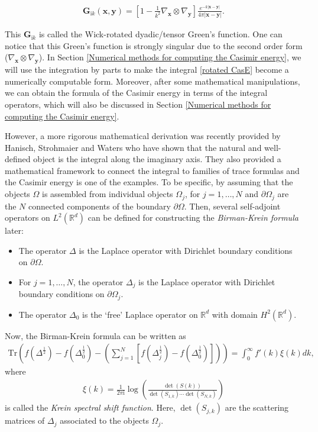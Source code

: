 \begin{align*}
    \boldsymbol{G}_{\mathrm{i}k}(\boldsymbol{x}, \boldsymbol{y}) = \left[1 - \frac{1}{k^{2}}\nabla_{\boldsymbol{x}}\otimes\nabla_{\boldsymbol{y}}\right]\frac{e^{-k|\boldsymbol{x} - \boldsymbol{y}|}}{4\pi|\boldsymbol{x} - \boldsymbol{y}|}.
\end{align*}

This $ \boldsymbol{G}_{\mathrm{i}k}$ is called the Wick-rotated dyadic/tensor Green's function. One can notice that this Green's function is strongly singular 
due to the second order form ($\nabla_{\boldsymbol{x}}\otimes\nabla_{\boldsymbol{y}}$). In Section \ref{Numerical methods for computing the Casimir energy}, we 
will use the integration by parts to make the integral \eqref{rotated CasE} become a numerically computable form. Moreover, after some mathematical manipulations, 
we can obtain the formula of the Casimir energy in terms of the integral operators, which will also be discussed in Section \ref{Numerical methods for computing the Casimir energy}.


However, a more rigorous mathematical 
derivation was recently provided by Hanisch, Strohmaier and Waters \cite{hanisch2020relative} who have shown that the natural and well-defined object is the 
integral along the imaginary axis. They also provided a mathematical framework to connect the integral to families of trace formulas and the Casimir 
energy is one of the examples. To be specific, by assuming that the objects $\Omega$ is assembled from individual objects $\Omega_{j}$, for $j = 1, \dots, N$ and 
$\partial\Omega_{j}$ are the $N$ connected components of the boundary $\partial\Omega$. Then, several self-adjoint operators on $L^{2}(\mathbb{R}^{d})$
can be defined for constructing the \emph{Birman-Krein formula} later:
\begin{itemize}
    \item The operator $\Delta$ is the Laplace operator with Dirichlet boundary conditions on $\partial\Omega$.
    \item For $j = 1, \dots, N$, the operator $\Delta_{j}$ is the Laplace operator with Dirichlet boundary conditions on $\partial\Omega_{j}$.
    \item The operator $\Delta_{0}$ is the `free' Laplace operator on $\mathbb{R}^{d}$ with domain $H^{2}(\mathbb{R}^{d})$.
\end{itemize}

Now, the Birman-Krein formula can be written as 
\begin{align}\label{B-K formula}
    \text{Tr}\left(f(\Delta^{\frac{1}{2}}) - f(\Delta_{0}^{\frac{1}{2}}) - \left(\sum_{j = 1}^{N}[f(\Delta_{j}^{\frac{1}{2}}) - f(\Delta_{0}^{\frac{1}{2}})]\right)\right)  = \int_{0}^{\infty}f'(k)\xi(k)dk,
\end{align}
where 
\begin{align*}
    \xi(k) = \frac{1}{2\pi \mathrm{i}}\log\left(\frac{\det(S(k))}{\det(S_{1,k})\cdots\det(S_{N,k})}\right)
\end{align*}
is called the \emph{Krein spectral shift function}. Here, $\det(S_{j,k})$ are the scattering matrices of $\Delta_{j}$ associated to the objects $\Omega_{j}$.

